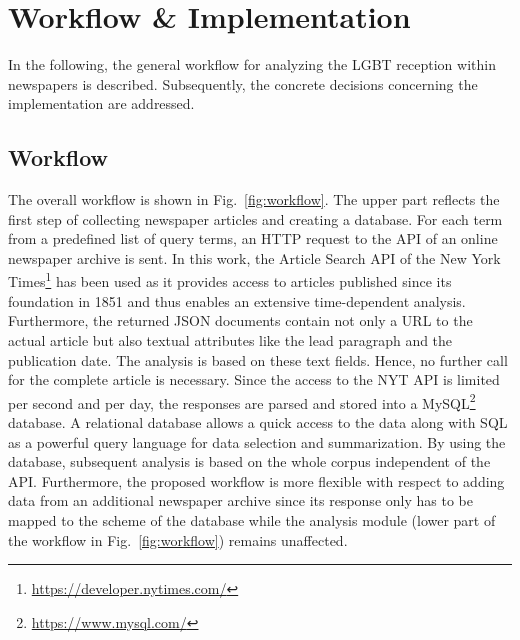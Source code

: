 \documentclass[10pt,a4paper,twocolumn]{scrartcl}
\begin{document}
\section{Workflow \& Implementation}\label{sec:workflow}
In the following, the general workflow for analyzing the LGBT reception within newspapers is described. Subsequently, the concrete decisions concerning the implementation are addressed.

\subsection*{Workflow} The overall workflow is shown in Fig.~\ref{fig:workflow}. The upper part reflects the first step of collecting newspaper articles and creating a database. For each term from a predefined list of query terms, an HTTP request to the API of an online newspaper archive is sent. In this work, the Article Search API of the New York Times\footnote{\url{https://developer.nytimes.com/}} has been used as it provides access to articles published since its foundation in 1851 and thus enables an extensive time-dependent analysis. Furthermore, the returned JSON documents contain not only a URL to the actual article but also textual attributes like the lead paragraph and the publication date. The analysis is based on these text fields. Hence, no further call for the complete article is necessary. Since the access to the NYT API is limited per second and per day, the responses are parsed and stored into a MySQL\footnote{\url{https://www.mysql.com/}} database. A relational database allows a quick access to the data along with SQL as a powerful query language for data selection and summarization. By using the database, subsequent analysis is based on the whole corpus independent of the API. Furthermore, the proposed workflow is more flexible with respect to adding data from an additional newspaper archive since its response only has to be mapped to the scheme of the database while the analysis module (lower part of the workflow in Fig.~\ref{fig:workflow}) remains unaffected.
\end{document}
